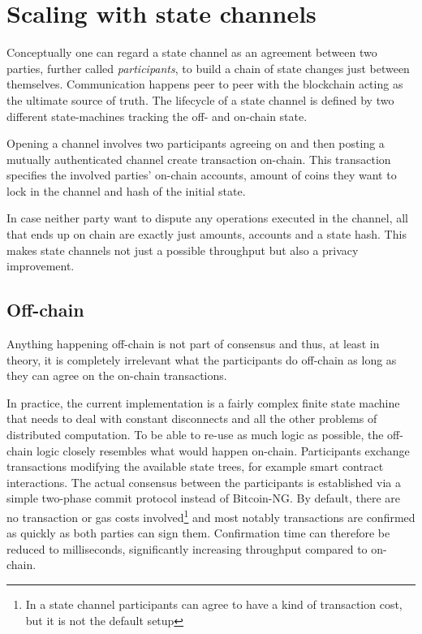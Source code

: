\section{Scaling with state channels}
\label{sect:channels}

Conceptually one can regard a state channel as an agreement between
two parties, further called \textit{participants}, to build a chain of
state changes just between themselves.
Communication happens peer to peer with the blockchain acting as the ultimate
source of truth.
The lifecycle of a state channel is defined by two different state-machines
tracking the off- and on-chain state.

Opening a channel involves two participants agreeing on and then posting a
mutually authenticated channel create transaction on-chain. This transaction
specifies the involved parties' on-chain accounts, amount of coins they want to
lock in the channel and hash of the initial state.

In case neither party want to dispute any operations executed in the channel,
all that ends up on chain are exactly just amounts, accounts and a state hash.
This makes state channels not just a possible throughput but also a privacy
improvement.

\subsection{Off-chain}

Anything happening off-chain is not part of consensus and thus, at least in
theory, it is completely irrelevant what the participants do off-chain as long
as they can agree on the on-chain transactions.

In practice, the current implementation is a fairly complex finite state
machine that needs to deal with constant disconnects and all the other problems
of distributed computation. To be able to re-use as much logic as possible, the
off-chain logic closely resembles what would happen on-chain. Participants
exchange transactions modifying the available state trees, for example smart
contract interactions.
The actual consensus between the participants is established via a simple
two-phase commit protocol instead of Bitcoin-NG.
By default, there are no transaction or gas costs involved\footnote{In a state
channel participants can agree to have a kind of transaction cost, but it
is not the default setup} and most notably transactions are confirmed as
quickly as both parties can sign them. Confirmation time can therefore be
reduced to milliseconds, significantly increasing throughput compared to
on-chain.

